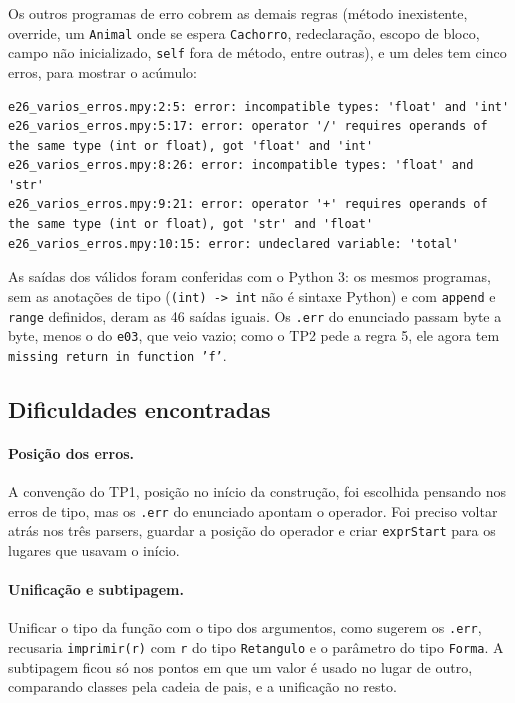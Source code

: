 \documentclass[12pt,a4paper]{article}
\begin{document}
Os outros programas de erro cobrem as demais regras (método
inexistente, override, um \texttt{Animal} onde se espera
\texttt{Cachorro}, redeclaração, escopo de bloco, campo não
inicializado, \texttt{self} fora de método, entre outras), e um deles
tem cinco erros, para mostrar o acúmulo:

\begin{lstlisting}[style=gram]
e26_varios_erros.mpy:2:5: error: incompatible types: 'float' and 'int'
e26_varios_erros.mpy:5:17: error: operator '/' requires operands of the same type (int or float), got 'float' and 'int'
e26_varios_erros.mpy:8:26: error: incompatible types: 'float' and 'str'
e26_varios_erros.mpy:9:21: error: operator '+' requires operands of the same type (int or float), got 'str' and 'float'
e26_varios_erros.mpy:10:15: error: undeclared variable: 'total'
\end{lstlisting}

As saídas dos válidos foram conferidas com o Python 3: os mesmos
programas, sem as anotações de tipo (\texttt{(int) -> int} não é
sintaxe Python) e com \texttt{append} e \texttt{range} definidos,
deram as 46 saídas iguais. Os \texttt{.err} do enunciado passam byte a
byte, menos o do \texttt{e03}, que veio vazio; como o TP2 pede a regra
5, ele agora tem \texttt{missing return in function 'f'}.

\subsection{Dificuldades encontradas}

\paragraph{Posição dos erros.} A convenção do TP1, posição no início
da construção, foi escolhida pensando nos erros de tipo, mas os
\texttt{.err} do enunciado apontam o operador. Foi preciso voltar
atrás nos três parsers, guardar a posição do operador e criar
\texttt{exprStart} para os lugares que usavam o início.

\paragraph{Unificação e subtipagem.} Unificar o tipo da função com o
tipo dos argumentos, como sugerem os \texttt{.err}, recusaria
\texttt{imprimir(r)} com \texttt{r} do tipo \texttt{Retangulo} e o
parâmetro do tipo \texttt{Forma}. A subtipagem ficou só nos pontos em
que um valor é usado no lugar de outro, comparando classes pela cadeia
de pais, e a unificação no resto.
\end{document}
